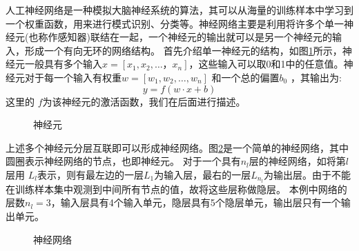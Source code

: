 人工神经网络是一种模拟大脑神经系统的算法，其可以从海量的训练样本中学习到一个权重函数，用来进行模式识别、分类等。神经网络主要是利用将许多个单一神经元(也称作感知器)联结在一起，一个神经元的输出就可以是另一个神经元的输入，形成一个有向无环的网络结构。
首先介绍单一神经元的结构，如图\ref{fig:neural}所示，神经元一般具有多个输入$x=[x_1,x_2,\dots，x_n] $，这些输入可以取0和1中的任意值。神经元对于每一个输入有权重$w=[w_1,w_2,\dots,w_n] $ 和一个总的偏置$b_0$ ，其输出为:
\begin{equation}
  y = f(w\cdot x + b)
  \label{equ:neural}
\end{equation}
这里的 $f$为该神经元的激活函数，我们在后面进行描述。

\begin{figure}
  \centering   \sWuhao
  
  \caption{神经元}
  \label{fig:neural}
\end{figure}

上述多个神经元分层互联即可以形成神经网络。图\ref{fig:network}是一个简单的神经网络，其中圆圈表示神经网络的节点，也即神经元。
对于一个具有$n_l$层的神经网络，如将第$ l $层用 $ L_l$表示，则有最左边的一层$  L_1$为输入层，最右的一层$ L_{n_l} $为输出层。由于不能在训练样本集中观测到中间所有节点的值，故将这些层称做隐层。
本例中网络的层数$ n_l=3$，输入层具有4个输入单元，隐层具有5个隐层单元，输出层只有一个输出单元。

\begin{figure}
  \centering
  \sWuhao
  
  \caption{神经网络}
  \label{fig:network}
\end{figure}


